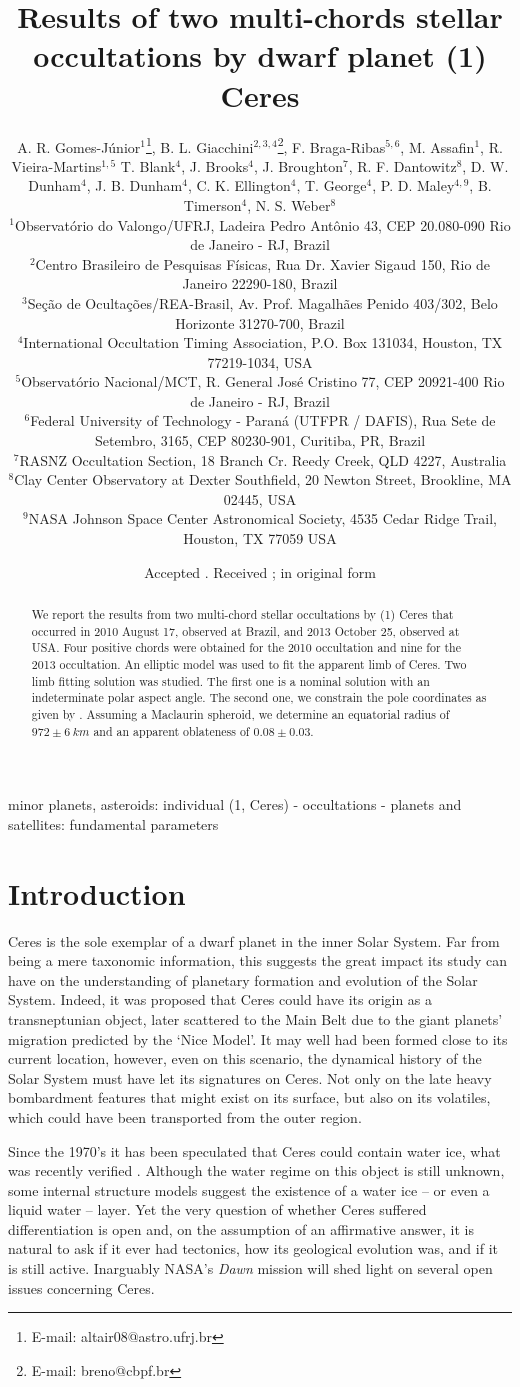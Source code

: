\documentclass[useAMS,usenatbib]{mn2e}
\title[Results of two stellar occultations by Ceres]{Results of two multi-chords stellar occultations by dwarf planet (1) Ceres}
\author[A. R. Gomes-J\'unior, B. L. Giacchini, F. Braga-Ribas et al.]{A. R. Gomes-J\'unior$^{1}$\thanks{E-mail:
altair08@astro.ufrj.br},
B. L. Giacchini$^{2,3,4}$\thanks{E-mail: breno@cbpf.br},
F. Braga-Ribas$^{5, 6}$,
M. Assafin$^{1}$,\newauthor
R. Vieira-Martins$^{1,5}$
T. Blank$^{4}$, 
J. Brooks$^{4}$, 
J. Broughton$^{7}$, 
R. F. Dantowitz$^{8}$, \newauthor
D. W. Dunham$^{4}$, 
J. B. Dunham$^{4}$, 
C. K. Ellington$^{4}$, 
T. George$^{4}$, 
P. D. Maley$^{4,9}$, \newauthor
B. Timerson$^{4}$, 
N. S. Weber$^{8}$\\
$^{1}$Observat\'orio do Valongo/UFRJ, Ladeira Pedro Ant\^onio 43,
CEP 20.080-090 Rio de Janeiro - RJ, Brazil\\
$^{2}$Centro Brasileiro de Pesquisas F\'isicas, Rua Dr. Xavier Sigaud 150, Rio de Janeiro  22290-180, Brazil\\
$^{3}$Se\c{c}\~ao de Oculta\c{c}\~oes/REA-Brasil, Av. Prof. Magalh\~aes Penido 403/302, Belo Horizonte 31270-700, Brazil\\
$^{4}$International Occultation Timing Association, P.O. Box 131034, Houston, TX 77219-1034, USA\\
$^{5}$Observat\'orio Nacional/MCT, R. General Jos\'e Cristino 77, CEP 20921-400 Rio de Janeiro - RJ, Brazil\\
$^{6}$Federal University of Technology - Paraná (UTFPR / DAFIS), Rua Sete de Setembro, 3165, CEP 80230-901, Curitiba, PR, Brazil\\
$^{7}$RASNZ Occultation Section, 18 Branch Cr. Reedy Creek, QLD 4227, Australia\\
$^{8}$Clay Center Observatory at Dexter Southfield, 20 Newton Street, Brookline, MA 02445, USA\\
$^{9}$NASA Johnson Space Center Astronomical Society, 4535 Cedar Ridge Trail, Houston, TX 77059 USA}
\begin{document}
\date{Accepted . Received ; in original form }

\pagerange{\pageref{firstpage}--\pageref{lastpage}} 

\maketitle

\label{firstpage}

\begin{abstract}
We report the results from two multi-chord stellar occultations by (1) Ceres that occurred in 2010 August 17, observed at Brazil, and 2013 October 25, observed at USA. Four positive chords were obtained for the 2010 occultation and nine for the 2013 occultation. An elliptic model was used to fit the apparent limb of Ceres. Two limb fitting solution was studied. The first one is a nominal solution with an indeterminate polar aspect angle. The second one, we constrain the pole coordinates as given by \cite{Drummond2014}. Assuming a Maclaurin spheroid, we determine an equatorial radius of $972 \pm 6~km$ and an apparent oblateness of $0.08 \pm 0.03$.
\end{abstract}

\begin{keywords}
minor planets, asteroids: individual (1, Ceres) - occultations - planets and satellites: fundamental parameters
\end{keywords}

\section{Introduction}

Ceres is the sole exemplar of a dwarf planet in the inner Solar System. Far from being a mere taxonomic information, this suggests the great impact its study can have on the understanding of planetary formation and evolution of the Solar System. Indeed, it was proposed that Ceres could have its origin as a transneptunian object, later scattered to the Main Belt due to the giant planets' migration predicted by the `Nice Model'. It may well had been formed close to its current location, however, even on this scenario, the dynamical history of the Solar System must have let its signatures on Ceres. Not only on the late heavy bombardment features that might exist on its surface, but also on its volatiles, which could have been transported from the outer region.

Since the 1970's it has been speculated that Ceres could contain water ice, what was recently verified \citep{Kuppers2014}. Although the water regime on this object is still unknown, some internal structure models suggest the existence of a water ice -- or even a liquid water -- layer. Yet the very question of whether Ceres suffered differentiation is open and, on the assumption of an affirmative answer, it is natural to ask if it ever had tectonics, how its geological evolution was, and if it is still active. Inarguably NASA's \textit{Dawn} mission will shed light on several open issues concerning Ceres.
\end{document}
